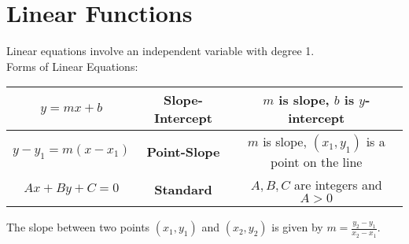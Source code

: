\section{Linear Functions}
    Linear equations involve an independent variable with degree 1. \\
    Forms of Linear Equations: \\

    \begin{center}
        \begin{tabular}{|c|c|c|}
            \hline
            $y=mx+b$    & \textbf{Slope-Intercept} & $m$ is slope, $b$ is $y$-intercept \\
            \hline
            $y-y_1=m(x-x_1)$ & \textbf{Point-Slope} & $m$ is slope, $(x_1, y_1)$ is a point
            on the line \\
            \hline
            $Ax+By+C=0$ & \textbf{Standard}        & $A,B,C$ are integers and $A>0$     \\
            \hline
        \end{tabular}
    \end{center}

    \noindent The slope between two points $(x_1,y_1)$ and $(x_2,y_2)$ is given by
    $m=\frac{y_2-y_1}{x_2-x_1}$.